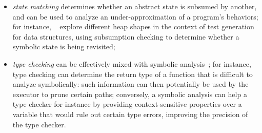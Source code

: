 \begin{itemize}
  \item {\em state matching} determines whether an abstract state is subsumed by another, and can be used to analyze an under-approximation of a program's behaviors; for instance, ~\cite{APV-SPIN06,VPP-ISSTA06} explore different heap shapes in the context of test generation for data structures, using subsumption checking to determine whether a symbolic state is being revisited; %
  \item {\em type checking} can be effectively mixed with symbolic analysis~\cite{KCF-PLDI10};  for instance, type checking can determine the return type of a function that is difficult to analyze symbolically: such information can then potentially be used by the executor to prune certain paths; conversely, a symbolic analysis can help a type checker for instance by providing context-sensitive properties over a variable that would rule out certain type errors, improving the precision of the type checker.
\end{itemize}

